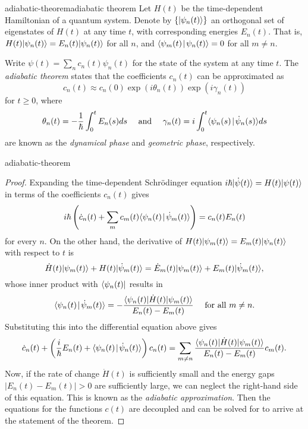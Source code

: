 \begin{topic}{adiabatic-theorem}{adiabatic theorem}
    Let $H(t)$ be the time-dependent Hamiltonian of a quantum system. Denote by $\{ |\psi_n(t)\rangle \}$ an orthogonal set of eigenstates of $H(t)$ at any time $t$, with corresponding energies $E_n(t)$. That is, $H(t) |\psi_n(t)\rangle = E_n(t) |\psi_n(t)\rangle$ for all $n$, and $\langle\psi_m(t)\!\mid\!\psi_n(t)\rangle = 0$ for all $m \ne n$.

    Write $\psi(t) = \sum_{n} c_n(t) \psi_n(t)$ for the state of the system at any time $t$. The \emph{adiabatic theorem} states that the coefficients $c_n(t)$ can be approximated as
    \[ c_n(t) \approx c_n(0) \exp(i \theta_n(t)) \exp(i \gamma_n(t)) \]
    for $t \ge 0$, where
    \[ \theta_n(t) = - \frac{1}{\hbar} \int_{0}^{t} E_n(s) ds \quad \textup{ and } \quad \gamma_n(t) = i \int_{0}^{t} \langle\psi_n(s)\!\mid\!\dot{\psi}_n(s)\rangle ds \]
    are known as the \textit{dynamical phase} and \textit{geometric phase}, respectively.
\end{topic}

\begin{example}{adiabatic-theorem}
    \begin{proof}
        Expanding the time-dependent Schrödinger equation $i \hbar |\dot{\psi}(t)\rangle = H(t) |\psi(t)\rangle$ in terms of the coefficients $c_n(t)$ gives
        \[ i \hbar \left( \dot{c}_n(t) + \sum_{m} c_m(t) \langle\psi_n(t)\!\mid\!\dot{\psi}_m(t)\rangle \right) = c_n(t) E_n(t) \]
        for every $n$. On the other hand, the derivative of $H(t) |\psi_m(t)\rangle = E_m(t) |\psi_n(t)\rangle$ with respect to $t$ is
        \[ \dot{H}(t) |\psi_m(t)\rangle + H(t) |\dot{\psi}_m(t)\rangle = \dot{E}_m(t) |\psi_m(t)\rangle + E_m(t) |\dot{\psi}_m(t)\rangle , \]
        whose inner product with $\langle\psi_n(t)|$ results in
        \[ \langle\psi_n(t)\!\mid\!\dot{\psi}_m(t)\rangle = - \frac{\langle\psi_n(t)| \dot{H}(t) |\psi_m(t)\rangle}{E_n(t) - E_m(t)} \quad \textup{ for all } m \ne n . \]
        Substituting this into the differential equation above gives
        \[ \dot{c}_n(t) + \left( \frac{i}{\hbar} E_n(t) + \langle\psi_n(t)\!\mid\!\dot{\psi}_n(t)\rangle \right) c_n(t) = \sum_{m \ne n} \frac{\langle\psi_n(t)| \dot{H}(t) |\psi_m(t)\rangle}{E_n(t) - E_m(t)} c_m(t) . \]
        Now, if the rate of change $\dot{H}(t)$ is sufficiently small and the energy gaps $|E_n(t) - E_m(t)| > 0$ are sufficiently large, we can neglect the right-hand side of this equation. This is known as the \textit{adiabatic approximation}. Then the equations for the functions $c(t)$ are decoupled and can be solved for to arrive at the statement of the theorem.
    \end{proof}
\end{example}

